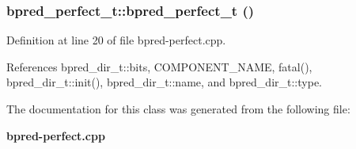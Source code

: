 \subsubsection[{bpred\_\-perfect\_\-t}]{\setlength{\rightskip}{0pt plus 5cm}bpred\_\-perfect\_\-t::bpred\_\-perfect\_\-t ()\hspace{0.3cm}{\tt  [inline]}}\label{classbpred__perfect__t_b3156d0207bb3614428e0d874d6bb69a}




Definition at line 20 of file bpred-perfect.cpp.

References bpred\_\-dir\_\-t::bits, COMPONENT\_\-NAME, fatal(), bpred\_\-dir\_\-t::init(), bpred\_\-dir\_\-t::name, and bpred\_\-dir\_\-t::type.

The documentation for this class was generated from the following file:\begin{CompactItemize}
\item 
{\bf bpred-perfect.cpp}\end{CompactItemize}
